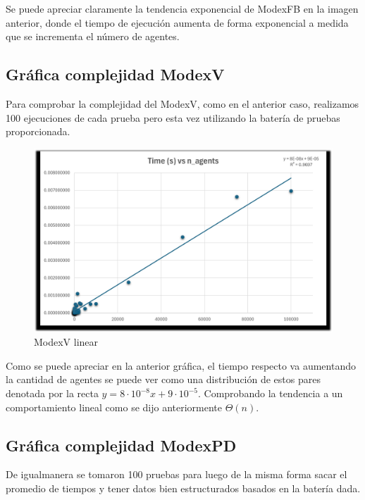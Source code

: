 \documentclass[letterpaper,10pt]{article}
\begin{document}
Se puede apreciar claramente la tendencia exponencial de ModexFB en la imagen anterior, donde el tiempo de ejecución aumenta de forma exponencial a medida que se incrementa el número de agentes.

\subsection{Gráfica complejidad  ModexV}
Para comprobar la complejidad del ModexV, como en el anterior caso, realizamos 100 ejecuciones de cada prueba pero esta vez utilizando la batería de pruebas proporcionada. 


\begin{figure}[H]
  \centering
  \begin{minipage}{1\textwidth}
    \centering
    \includegraphics[width=\textwidth]{Images/modexvcomplexity.png}
  \end{minipage}
  \caption{ModexV linear} 
  \label{fig:modexvcomplexity}
\end{figure}
Como se puede apreciar en la anterior gráfica, el tiempo respecto va aumentando la cantidad de agentes se puede ver como una distribución de estos pares denotada por la recta $y=8\cdot 10^{-8}x+9\cdot10^{-5}$.
Comprobando la tendencia a un comportamiento lineal como se dijo anteriormente $\Theta(n)$.


\subsection{Gráfica complejidad ModexPD}
De igualmanera se tomaron 100 pruebas para luego de la misma forma sacar el promedio de tiempos y tener datos bien estructurados basados en la batería dada.
\end{document}
